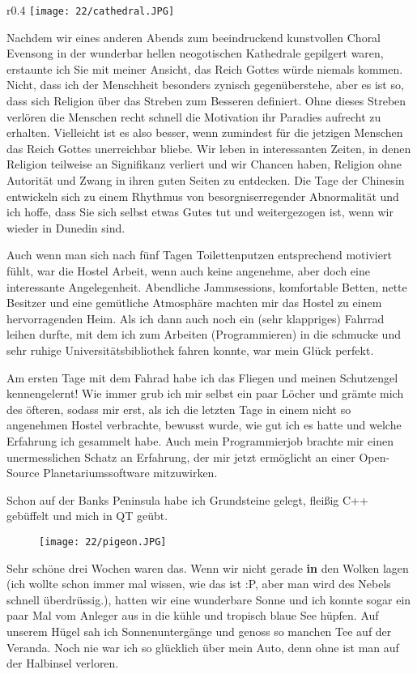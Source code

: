 \begin{wrapfigure}{r}{0.4\textwidth}
  \centering
  \texttt{[image: 22/cathedral.JPG]}
\end{wrapfigure}
Nachdem wir eines anderen Abends zum beeindruckend kunstvollen Choral
Evensong in der wunderbar hellen neogotischen Kathedrale gepilgert
waren, erstaunte ich Sie mit meiner Ansicht, das Reich Gottes würde
niemals kommen. Nicht, dass ich der Menschheit besonders zynisch
gegenüberstehe, aber es ist so, dass sich Religion über das Streben
zum Besseren definiert. Ohne dieses Streben verlören die Menschen
recht schnell die Motivation ihr Paradies aufrecht zu
erhalten. Vielleicht ist es also besser, wenn zumindest für die
jetzigen Menschen das Reich Gottes unerreichbar bliebe. Wir leben in
interessanten Zeiten, in denen Religion teilweise an Signifikanz
verliert und wir Chancen haben, Religion ohne Autorität und Zwang in
ihren guten Seiten zu entdecken. Die Tage der Chinesin entwickeln sich
zu einem Rhythmus von besorgniserregender Abnormalität und ich hoffe,
dass Sie sich selbst etwas Gutes tut und weitergezogen ist, wenn wir
wieder in Dunedin sind.

Auch wenn man sich nach fünf Tagen Toilettenputzen entsprechend
motiviert fühlt, war die Hostel Arbeit, wenn auch keine angenehme, aber
doch eine interessante Angelegenheit. Abendliche Jammsessions,
komfortable Betten, nette Besitzer und eine gemütliche Atmosphäre
machten mir das Hostel zu einem hervorragenden Heim. Als ich dann auch
noch ein (sehr klappriges) Fahrrad leihen durfte, mit dem ich zum
Arbeiten (Programmieren) in die schmucke und sehr ruhige
Universitätsbibliothek fahren konnte, war mein Glück perfekt.

Am ersten Tage mit dem Fahrad habe ich das Fliegen und meinen
Schutzengel kennengelernt! Wie immer grub ich mir selbst ein paar
Löcher und grämte mich des öfteren, sodass mir erst, als ich die
letzten Tage in einem nicht so angenehmen Hostel verbrachte, bewusst
wurde, wie gut ich es hatte und welche Erfahrung ich gesammelt
habe. Auch mein Programmierjob brachte mir einen unermesslichen Schatz
an Erfahrung, der mir jetzt ermöglicht an einer Open-Source
Planetariumssoftware mitzuwirken.

Schon auf der Banks Peninsula habe ich Grundsteine gelegt, fleißig C++
gebüffelt und mich in QT geübt.

\begin{figure}[h]
  \centering
  \texttt{[image: 22/pigeon.JPG]}
\end{figure}
Sehr schöne drei Wochen waren das. Wenn wir nicht gerade
\textbf{\textbf{in}} den Wolken lagen (ich wollte schon immer mal
wissen, wie das ist :P, aber man wird des Nebels schnell überdrüssig.),
hatten wir eine wunderbare Sonne und ich konnte sogar ein paar Mal vom
Anleger aus in die kühle und tropisch blaue See hüpfen. Auf unserem
Hügel sah ich Sonnenuntergänge und genoss so manchen Tee auf der
Veranda. Noch nie war ich so glücklich über mein Auto, denn ohne ist man
auf der Halbinsel verloren.

